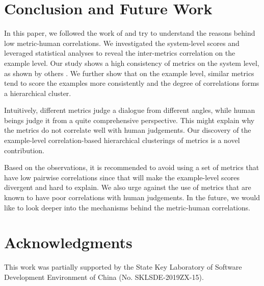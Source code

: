 \documentclass[conference]{IEEEtran}
\begin{document}
\section{Conclusion and Future Work}
In this paper, we followed the work of \cite{HowNot} and try to understand the reasons behind low metric-human correlations.
We investigated the system-level scores and leveraged statistical analyses to reveal the inter-metrics correlation on the example level.
Our study shows a high consistency of metrics on the system level, as shown by others \cite{HowNot,VHRED,GoogleChatbot}.
We further show that on the example level, similar metrics tend to score the examples more consistently and the degree of correlations forms a hierarchical cluster.

Intuitively, different metrics judge a dialogue from different angles, while human beings judge it from a quite comprehensive perspective.
This might explain why the metrics do not correlate well with human judgements.
Our discovery of the example-level correlation-based hierarchical clusterings of metrics is a novel contribution.

Based on the observations, it is recommended to avoid using a set of metrics that have low pairwise correlations since that will make the example-level scores divergent and hard to explain.
We also urge against the use of metrics that are known to have poor correlations with human judgements.
In the future, we would like to look deeper into the mechanisms behind the metric-human correlations.

\section*{Acknowledgments}
This work was partially supported by the State Key Laboratory of Software Development Environment of China (No. SKLSDE-2019ZX-15).



%
%
%
\balance




\end{document}
